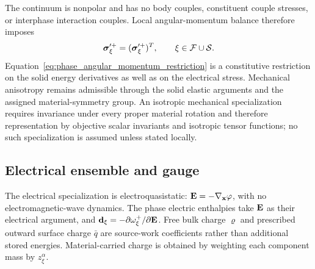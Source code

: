 The continuum is nonpolar and has no body couples, constituent couple stresses,
or interphase interaction couples.  Local angular-momentum balance therefore
imposes
%
\begin{equation}
	\boldsymbol{\sigma}_\xi^{\prime+}
	=
	(\boldsymbol{\sigma}_\xi^{\prime+})^T,
	\qquad
	\xi\in\mathcal{F}\cup\mathcal{S} .
	\label{eq:phase_angular_momentum_restriction}
\end{equation}
%
Equation~\eqref{eq:phase_angular_momentum_restriction} is a constitutive
restriction on the solid energy derivatives as well as on the electrical
stress.  Mechanical anisotropy remains admissible through the solid elastic
arguments and the assigned material-symmetry group.  An isotropic mechanical
specialization requires invariance under every proper material rotation and
therefore representation by objective scalar invariants and isotropic tensor
functions; no such specialization is assumed unless stated locally.

\subsection{Electrical ensemble and gauge}

The electrical specialization is electroquasistatic:
\(\mathbf{E}=-\nabla_{\mathbf{x}}\varphi\), with no electromagnetic-wave dynamics.
The phase electric enthalpies take \(\mathbf{E}\) as their electrical argument, and
\(\mathbf{d}_\xi=-\partial\omega_\xi^+/\partial\mathbf{E}\).  Free bulk charge
\(\varrho\) and prescribed outward surface charge \(\bar q\) are source-work
coefficients rather than additional stored energies.  Material-carried charge
is obtained by weighting each component mass by \(z_\xi^\alpha\).

